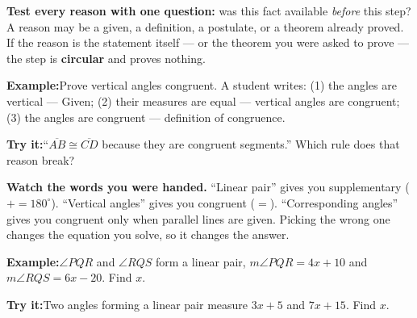 \documentclass[12pt]{article}
\begin{document}

\begin{formulabox}\textbf{Test every reason with one question:} was this fact available
\emph{before} this step? A reason may be a given, a definition, a postulate, or a
theorem already proved. If the reason is the statement itself --- or the theorem you
were asked to prove --- the step is \textbf{circular} and proves nothing.
\end{formulabox}
\begin{examplebox}\textbf{Example:}\quad Prove vertical angles congruent. A student
writes: (1) the angles are vertical --- Given; (2) their measures are equal --- vertical
angles are congruent; (3) the angles are congruent --- definition of congruence.
\end{examplebox}
\begin{tryitbox}\textbf{Try it:}\quad ``$\overline{AB} \cong \overline{CD}$ because they
are congruent segments.'' Which rule does that reason break?\\[2pt]
\end{tryitbox}

\begin{formulabox}\textbf{Watch the words you were handed.} ``Linear pair'' gives you
supplementary ($+ = 180^\circ$). ``Vertical angles'' gives you congruent ($=$).
``Corresponding angles'' gives you congruent only when parallel lines are given. Picking
the wrong one changes the equation you solve, so it changes the answer.
\end{formulabox}
\begin{examplebox}\textbf{Example:}\quad $\angle PQR$ and $\angle RQS$ form a linear
pair, $m\angle PQR = 4x + 10$ and $m\angle RQS = 6x - 20$. Find $x$.
\end{examplebox}
\begin{tryitbox}\textbf{Try it:}\quad Two angles forming a linear pair measure $3x + 5$
and $7x + 15$. Find $x$.\\[2pt]
\end{tryitbox}
\end{document}
